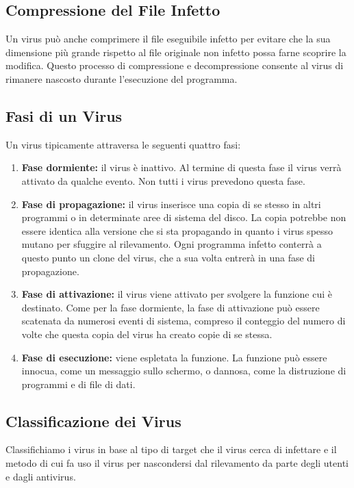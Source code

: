 \subsection{Compressione del File Infetto}

Un virus può anche comprimere il file eseguibile infetto per evitare che la sua dimensione più grande rispetto al file originale non infetto possa farne scoprire la modifica. Questo processo di compressione e decompressione consente al virus di rimanere nascosto durante l'esecuzione del programma.

\subsection{Fasi di un Virus}

Un virus tipicamente attraversa le seguenti quattro fasi:

\begin{enumerate}
    \item \textbf{Fase dormiente:} il virus è inattivo. Al termine di questa fase il virus verrà attivato da qualche evento. Non tutti i virus prevedono questa fase.
    \item \textbf{Fase di propagazione:} il virus inserisce una copia di se stesso in altri programmi o in determinate aree di sistema del disco. La copia potrebbe non essere identica alla versione che si sta propagando in quanto i virus spesso mutano per sfuggire al rilevamento. Ogni programma infetto conterrà a questo punto un clone del virus, che a sua volta entrerà in una fase di propagazione.
    \item \textbf{Fase di attivazione:} il virus viene attivato per svolgere la funzione cui è destinato. Come per la fase dormiente, la fase di attivazione può essere scatenata da numerosi eventi di sistema, compreso il conteggio del numero di volte che questa copia del virus ha creato copie di se stessa.
    \item \textbf{Fase di esecuzione:} viene espletata la funzione. La funzione può essere innocua, come un messaggio sullo schermo, o dannosa, come la distruzione di programmi e di file di dati.
\end{enumerate}

\subsection{Classificazione dei Virus}

Classifichiamo i virus in base al tipo di target che il virus cerca di infettare e il metodo di cui fa uso il virus per nascondersi dal rilevamento da parte degli utenti e dagli antivirus.

